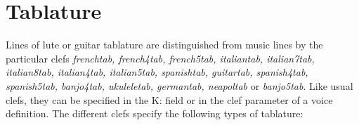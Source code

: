\documentclass[a4paper]{article}
\begin{document}
\section{Tablature}
 
  
Lines of lute or guitar tablature are distinguished from music lines 
by the particular clefs {\it frenchtab, french4tab, french5tab, 
italiantab, italian7tab, italian8tab, italian4tab, italian5tab,
spanishtab, guitartab, spanish4tab, spanish5tab, banjo4tab, ukuleletab, 
germantab, neapoltab} or {\it banjo5tab}. Like usual clefs, 
they can be specified in the K: field or in the clef parameter of 
a voice definition.
The different clefs specify the following types of tablature:
\end{document}
